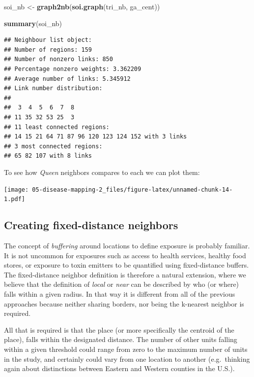 \documentclass[
]{book}
\newenvironment{Shaded}{\begin{snugshade}}{\end{snugshade}}
\newcommand{\FunctionTok}[1]{\textcolor[rgb]{0.13,0.29,0.53}{\textbf{#1}}}
\newcommand{\NormalTok}[1]{#1}
\newcommand{\OtherTok}[1]{\textcolor[rgb]{0.56,0.35,0.01}{#1}}
\begin{document}
\begin{Shaded}
\begin{Highlighting}[]
\NormalTok{soi\_nb }\OtherTok{\textless{}{-}} \FunctionTok{graph2nb}\NormalTok{(}\FunctionTok{soi.graph}\NormalTok{(tri\_nb, ga\_cent))}

\FunctionTok{summary}\NormalTok{(soi\_nb)}
\end{Highlighting}
\end{Shaded}

\begin{verbatim}
## Neighbour list object:
## Number of regions: 159 
## Number of nonzero links: 850 
## Percentage nonzero weights: 3.362209 
## Average number of links: 5.345912 
## Link number distribution:
## 
##  3  4  5  6  7  8 
## 11 35 32 53 25  3 
## 11 least connected regions:
## 14 15 21 64 71 87 96 120 123 124 152 with 3 links
## 3 most connected regions:
## 65 82 107 with 8 links
\end{verbatim}

To see how \emph{Queen} neighbors compares to each we can plot them:

\texttt{[image: 05-disease-mapping-2\_files/figure-latex/unnamed-chunk-14-1.pdf]}

\hypertarget{creating-fixed-distance-neighbors}{%
\subsection{Creating fixed-distance neighbors}\label{creating-fixed-distance-neighbors}}

The concept of \emph{buffering} around locations to define exposure is probably familiar. It is not uncommon for exposures such as access to health services, healthy food stores, or exposure to toxin emitters to be quantified using fixed-distance buffers. The fixed-distance neighbor definition is therefore a natural extension, where we believe that the definition of \emph{local} or \emph{near} can be described by who (or where) falls within a given radius. In that way it is different from all of the previous approaches because neither sharing borders, nor being the k-nearest neighbor is required.

All that is required is that the place (or more specifically the centroid of the place), falls within the designated distance. The number of other units falling within a given threshold could range from zero to the maximum number of units in the study, and certainly could vary from one location to another (e.g.~thinking again about distinctions between Eastern and Western counties in the U.S.).
\end{document}
